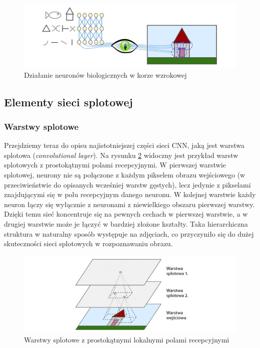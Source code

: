\documentclass[12pt]{mwbk}
\theoremstyle{plain}
\theoremstyle{definition}
\theoremstyle{remark}
\newcommand\zrodlo[1]{\par\vspace{-3mm}{\small\textit{Źródło: }#1 }}
\begin{document}
\begin{figure}[!h]
	\centering
	\includegraphics[width=\linewidth]{rys/kora_wzrokowa.png}
	\caption{Działanie neuronów biologicznych w korze wzrokowej}
	\zrodlo{\cite{geron}}
	\label{fig:kora-wzrokowa}
\end{figure}

\subsection{Elementy sieci splotowej}

\subsubsection{Warstwy splotowe}

Przejdziemy teraz do opisu najistotniejszej części sieci CNN, jaką jest warstwa splotowa (\emph{convolutional layer}). Na rysunku \ref{fig:warstwy-cnn} widoczny jest przykład warstw splotowych z prostokątnymi polami recepcyjnymi. W pierwszej warstwie splotowej, neurony nie są połączone z każdym pikselem obrazu wejściowego (w przeciwieństwie do opisanych wcześniej warstw gęstych), lecz jedynie z pikselami znajdującymi się w polu recepcyjnym danego neuronu. W kolejnej warstwie każdy neuron łączy się wyłącznie z neuronami z niewielkiego obszaru pierwszej warstwy. Dzięki temu sieć koncentruje się na pewnych cechach w pierwszej warstwie, a w drugiej warstwie może je łączyć w bardziej złożone kształty. Taka hierarchiczna struktura w naturalny sposób występuje na zdjęciach, co przyczyniło się do dużej skuteczności sieci splotowych w rozpoznawaniu obrazu.

\begin{figure}[!h]
	\centering
	\includegraphics[width=\linewidth]{rys/warstwy_cnn.png}
	\caption{Warstwy splotowe z prostokątnymi lokalnymi polami recepcyjnymi}
	\zrodlo{\cite{geron}}
	\label{fig:warstwy-cnn}
\end{figure}
\end{document}
